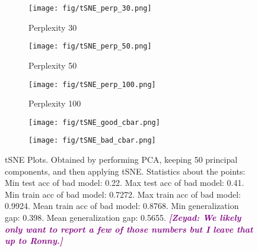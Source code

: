 \documentclass{article}
\newcommand{\zeyad}[1]{{  \textcolor{purple}{\bf \em [Zeyad: #1]}}}
\begin{document}

    \begin{figure}[b!]
        \centering
        \begin{subfigure}{.29\textwidth}
            \centering
            \texttt{[image: fig/tSNE\_perp\_30.png]}
            \caption{\small Perplexity 30}
            \label{fig:tSNE_perp100}
        \end{subfigure}
        \begin{subfigure}{.29\textwidth}
            \centering
            \texttt{[image: fig/tSNE\_perp\_50.png]}
            \caption{\small Perplexity 50}
            \label{fig:tSNE_perp50}
        \end{subfigure}
        \begin{subfigure}{.29\textwidth}
            \centering
            \texttt{[image: fig/tSNE\_perp\_100.png]}
            \caption{\small Perplexity 100}
            \label{fig:tSNE_perp100}
        \end{subfigure}
        \begin{subfigure}{.05\textwidth}
            \centering
            \texttt{[image: fig/tSNE\_good\_cbar.png]}
            \caption{}%
            \label{fig:epoch_num_cbar}
        \end{subfigure}
        \begin{subfigure}{.05\textwidth}
            \centering
            \texttt{[image: fig/tSNE\_bad\_cbar.png]}
            \caption{}%
            \label{fig:acc_cbar}
        \end{subfigure}
        \caption{\small tSNE Plots. Obtained by performing PCA, keeping 50 principal components, and then applying tSNE. Statistics about the points:
        Min test acc of bad model: 0.22.
        Max test acc of bad model: 0.41.
        Min train acc of bad model: 0.7272.
        Max train acc of bad model: 0.9924.
        Mean train acc of bad model: 0.8768.
        Min generalization gap: 0.398.
        Mean generalization gap: 0.5655. \zeyad{We likely only want to report a few of those numbers but I leave that up to Ronny.}}
        \label{fig:tsne}
    \end{figure}
\end{document}
